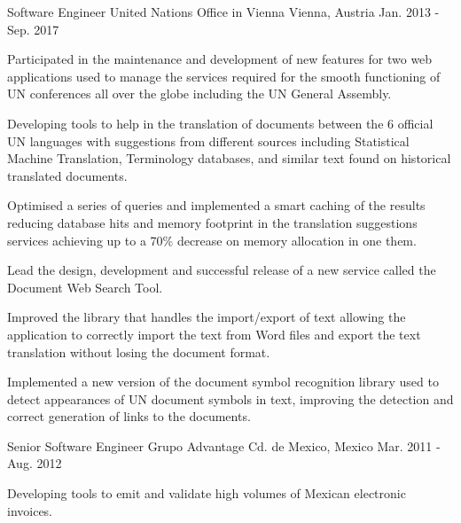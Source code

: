 \begin{cventries}
  \cventry
    {Software Engineer} %
    {United Nations Office in Vienna} %
    {Vienna, Austria} %
    {Jan. 2013 - Sep. 2017} %
    {}
    {
      \begin{cvitems} %
        \item {Participated in the maintenance and development of new features for two web applications used to manage the services required for the smooth functioning of UN conferences all over the globe including the UN General Assembly.}
        \item {Developing tools to help in the translation of documents between the 6 official UN languages with suggestions from different sources including Statistical Machine Translation, Terminology databases, and similar text found on historical translated documents.}
        \item {Optimised a series of queries and implemented a smart caching of the results reducing database hits and memory footprint in the translation suggestions services achieving up to a 70\% decrease on memory allocation in one them.}
        \item {Lead the design, development and successful release of a new service called the Document Web Search Tool.}
        \item {Improved the library that handles the import/export of text allowing the application to correctly import the text from Word files and export the text translation without losing the document format.}
        \item {Implemented a new version of the document symbol recognition library used to detect appearances of UN document symbols in text, improving the detection and correct generation of links to the documents.}
      \end{cvitems}
    }
  \cventry
    {Senior Software Engineer} %
    {Grupo Advantage} %
    {Cd. de Mexico, Mexico} %
    {Mar. 2011 - Aug. 2012} %
    {}
    {
      \begin{cvitems} %
        \item {Developing tools to emit and validate high volumes of Mexican electronic invoices.}
      \end{cvitems}
    }


\end{cventries}
